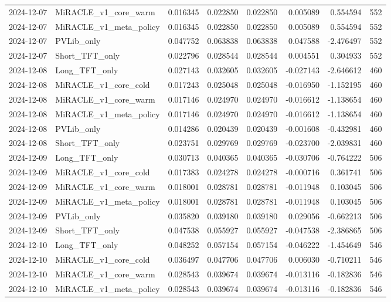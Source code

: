 \begin{tabular}{llrrrrrr}
2024-12-07 & MiRACLE_v1_core_warm & 0.016345 & 0.022850 & 0.022850 & 0.005089 & 0.554594 & 552 \\
2024-12-07 & MiRACLE_v1_meta_policy & 0.016345 & 0.022850 & 0.022850 & 0.005089 & 0.554594 & 552 \\
2024-12-07 & PVLib_only & 0.047752 & 0.063838 & 0.063838 & 0.047588 & -2.476497 & 552 \\
2024-12-07 & Short_TFT_only & 0.022796 & 0.028544 & 0.028544 & 0.004551 & 0.304933 & 552 \\
2024-12-08 & Long_TFT_only & 0.027143 & 0.032605 & 0.032605 & -0.027143 & -2.646612 & 460 \\
2024-12-08 & MiRACLE_v1_core_cold & 0.017243 & 0.025048 & 0.025048 & -0.016950 & -1.152195 & 460 \\
2024-12-08 & MiRACLE_v1_core_warm & 0.017146 & 0.024970 & 0.024970 & -0.016612 & -1.138654 & 460 \\
2024-12-08 & MiRACLE_v1_meta_policy & 0.017146 & 0.024970 & 0.024970 & -0.016612 & -1.138654 & 460 \\
2024-12-08 & PVLib_only & 0.014286 & 0.020439 & 0.020439 & -0.001608 & -0.432981 & 460 \\
2024-12-08 & Short_TFT_only & 0.023751 & 0.029769 & 0.029769 & -0.023700 & -2.039831 & 460 \\
2024-12-09 & Long_TFT_only & 0.030713 & 0.040365 & 0.040365 & -0.030706 & -0.764222 & 506 \\
2024-12-09 & MiRACLE_v1_core_cold & 0.017383 & 0.024278 & 0.024278 & -0.000716 & 0.361741 & 506 \\
2024-12-09 & MiRACLE_v1_core_warm & 0.018001 & 0.028781 & 0.028781 & -0.011948 & 0.103045 & 506 \\
2024-12-09 & MiRACLE_v1_meta_policy & 0.018001 & 0.028781 & 0.028781 & -0.011948 & 0.103045 & 506 \\
2024-12-09 & PVLib_only & 0.035820 & 0.039180 & 0.039180 & 0.029056 & -0.662213 & 506 \\
2024-12-09 & Short_TFT_only & 0.047538 & 0.055927 & 0.055927 & -0.047538 & -2.386865 & 506 \\
2024-12-10 & Long_TFT_only & 0.048252 & 0.057154 & 0.057154 & -0.046222 & -1.454649 & 546 \\
2024-12-10 & MiRACLE_v1_core_cold & 0.036497 & 0.047706 & 0.047706 & 0.006030 & -0.710211 & 546 \\
2024-12-10 & MiRACLE_v1_core_warm & 0.028543 & 0.039674 & 0.039674 & -0.013116 & -0.182836 & 546 \\
2024-12-10 & MiRACLE_v1_meta_policy & 0.028543 & 0.039674 & 0.039674 & -0.013116 & -0.182836 & 546 \\

\end{tabular}
